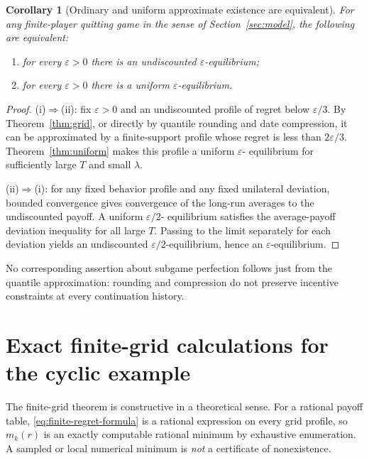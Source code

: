 \documentclass[11pt,a4paper]{article}
\numberwithin{equation}{section}
\theoremstyle{plain}
\newtheorem{corollary}[theorem]{Corollary}
\theoremstyle{definition}
\theoremstyle{remark}
\newcommand{\eps}{\varepsilon}
\begin{document}
\begin{corollary}[Ordinary and uniform approximate existence are equivalent]\label{cor:equivalence}
For any finite-player quitting game in the sense of
Section~\ref{sec:model}, the following are equivalent:
\begin{enumerate}[label=(\roman*)]
\item for every $\eps>0$ there is an undiscounted $\eps$-equilibrium;
\item for every $\eps>0$ there is a uniform $\eps$-equilibrium.
\end{enumerate}
\end{corollary}
\begin{proof}
(i)$\Rightarrow$(ii): fix $\eps>0$ and an undiscounted profile of
regret below $\eps/3$. By Theorem~\ref{thm:grid}, or directly by
quantile rounding and date compression, it can be approximated by
a finite-support profile whose regret is less than $2\eps/3$.
Theorem~\ref{thm:uniform} makes this profile a uniform $\eps$-
equilibrium for sufficiently large $T$ and small $\lambda$.

(ii)$\Rightarrow$(i): for any fixed behavior profile and any fixed
unilateral deviation, bounded convergence gives convergence of the
long-run averages to the undiscounted payoff. A uniform $\eps/2$-
equilibrium satisfies the average-payoff deviation inequality for all
large $T$. Passing to the limit separately for each deviation yields
an undiscounted $\eps/2$-equilibrium, hence an $\eps$-equilibrium.
\end{proof}

No corresponding assertion about subgame perfection follows just
from the quantile approximation: rounding and compression do not
preserve incentive constraints at every continuation history.

\section{Exact finite-grid calculations for the cyclic example}\label{sec:computation}
The finite-grid theorem is constructive in a theoretical sense.
For a rational payoff table, \eqref{eq:finite-regret-formula} is a
rational expression on every grid profile, so $m_k(r)$ is an exactly
computable rational minimum by exhaustive enumeration. A sampled or
local numerical minimum is \emph{not} a certificate of nonexistence.
\end{document}
